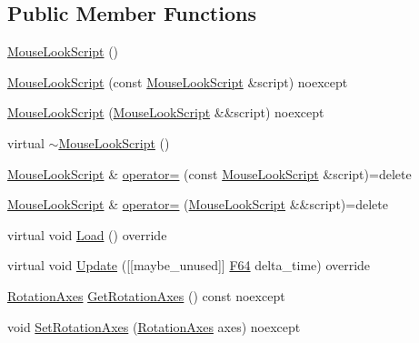 \subsection*{Public Member Functions}
\begin{DoxyCompactItemize}
\item 
\hyperlink{classmage_1_1script_1_1_mouse_look_script_a9055e93385160f4074cd2bc7fda3869e}{Mouse\+Look\+Script} ()
\item 
\hyperlink{classmage_1_1script_1_1_mouse_look_script_aa5237c229f27fa29f820bf6517209444}{Mouse\+Look\+Script} (const \hyperlink{classmage_1_1script_1_1_mouse_look_script}{Mouse\+Look\+Script} \&script) noexcept
\item 
\hyperlink{classmage_1_1script_1_1_mouse_look_script_ac21a383d6718ccc0d6c9faa5c5c1fe50}{Mouse\+Look\+Script} (\hyperlink{classmage_1_1script_1_1_mouse_look_script}{Mouse\+Look\+Script} \&\&script) noexcept
\item 
virtual \hyperlink{classmage_1_1script_1_1_mouse_look_script_a29a6d2cb4742fbf745822d015e72484f}{$\sim$\+Mouse\+Look\+Script} ()
\item 
\hyperlink{classmage_1_1script_1_1_mouse_look_script}{Mouse\+Look\+Script} \& \hyperlink{classmage_1_1script_1_1_mouse_look_script_af7da565d15422579ab5ff34f8f6bbc6a}{operator=} (const \hyperlink{classmage_1_1script_1_1_mouse_look_script}{Mouse\+Look\+Script} \&script)=delete
\item 
\hyperlink{classmage_1_1script_1_1_mouse_look_script}{Mouse\+Look\+Script} \& \hyperlink{classmage_1_1script_1_1_mouse_look_script_a019b949f86d066507ea74a9db126137e}{operator=} (\hyperlink{classmage_1_1script_1_1_mouse_look_script}{Mouse\+Look\+Script} \&\&script)=delete
\item 
virtual void \hyperlink{classmage_1_1script_1_1_mouse_look_script_a4b26f1ac71e89eaac7903101b95745e9}{Load} () override
\item 
virtual void \hyperlink{classmage_1_1script_1_1_mouse_look_script_a6d38748c21a6bc475e8ac31e24459053}{Update} (\mbox{[}\mbox{[}maybe\+\_\+unused\mbox{]}\mbox{]} \hyperlink{namespacemage_ad26233bbec640deda836e572c1a23708}{F64} delta\+\_\+time) override
\item 
\hyperlink{classmage_1_1script_1_1_mouse_look_script_aa8c8ce1a3e6ccefa7b8ddd31be209c23}{Rotation\+Axes} \hyperlink{classmage_1_1script_1_1_mouse_look_script_a612d8c23cc3f0711a07b32304082dfb5}{Get\+Rotation\+Axes} () const noexcept
\item 
void \hyperlink{classmage_1_1script_1_1_mouse_look_script_a82697e11738554a44b4a749227e231ee}{Set\+Rotation\+Axes} (\hyperlink{classmage_1_1script_1_1_mouse_look_script_aa8c8ce1a3e6ccefa7b8ddd31be209c23}{Rotation\+Axes} axes) noexcept

\end{DoxyCompactItemize}
